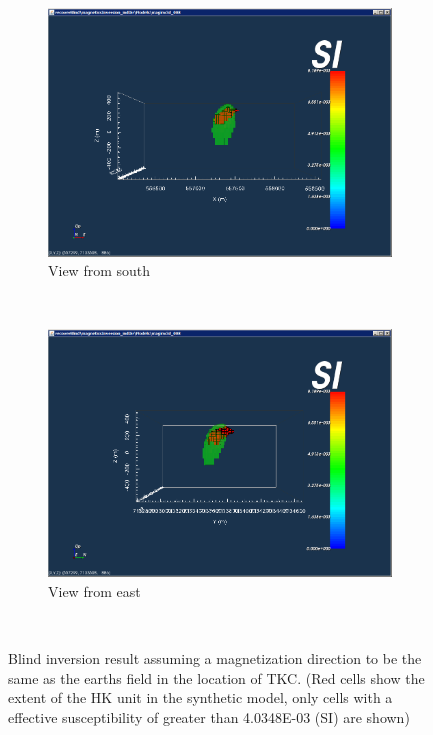 \begin{figure}
    \centering
    \begin{subfigure}[b]{0.5\textwidth}
        \includegraphics[width=\textwidth]{images/TKC/blindIndDirSouth.PNG}
        \caption{View from south}
        \label{fig:blindIndDirSouth}
    \end{subfigure}
    ~ %
    \begin{subfigure}[b]{0.5\textwidth}
        \includegraphics[width=\textwidth]{images/TKC/blindIndDirEast.PNG}
        \caption{View from east}
        \label{fig:blindIndDirEast}
    \end{subfigure}
    ~ %
   \caption{Blind inversion result assuming a magnetization direction to be the same as the earths field in the location of TKC. (Red cells show the extent of the HK unit in the synthetic model, only cells with a effective susceptibility of greater than 4.0348E-03 (SI) are shown)}
   \label{fig:blindIndDir}
\end{figure}

